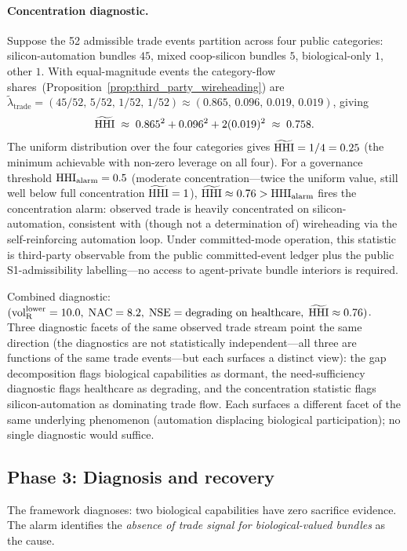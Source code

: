\paragraph{Concentration diagnostic.}
Suppose the 52 admissible trade events partition across four
public categories: silicon-automation bundles $45$, mixed
coop-silicon bundles $5$, biological-only $1$, other $1$.  With
equal-magnitude events the category-flow
shares~(Proposition~\ref{prop:third_party_wireheading}) are
$\tilde\lambda_{\mathrm{trade}} = (45/52,\, 5/52,\, 1/52,\,
1/52) \approx (0.865,\, 0.096,\, 0.019,\, 0.019)$, giving
\[
  \widetilde{\mathrm{HHI}} \;\approx\; 0.865^2 + 0.096^2 + 2(0.019)^2
  \;\approx\; 0.758.
\]
The uniform distribution over the four categories gives
$\widetilde{\mathrm{HHI}} = 1/4 = 0.25$ (the minimum achievable with
non-zero leverage on all four).  For a governance threshold
$\mathrm{HHI}_{\mathrm{alarm}} = 0.5$ (moderate concentration---twice
the uniform value, still well below full concentration
$\widetilde{\mathrm{HHI}} = 1$), $\widetilde{\mathrm{HHI}} \approx 0.76 >
\mathrm{HHI}_{\mathrm{alarm}}$ fires the concentration alarm: observed
trade is heavily concentrated on silicon-automation, consistent
with (though not a determination of) wireheading via the
self-reinforcing automation loop.  Under committed-mode
operation, this statistic is third-party observable from the
public committed-event ledger plus the public S1-admissibility
labelling---no access to agent-private bundle interiors is
required.

Combined diagnostic:
$({\operatorname{vol}_{\mathrm{R}}^{\mathrm{lower}}} = 10.0,\; \mathrm{NAC} = 8.2,\;
\mathrm{NSE} = \text{degrading on healthcare},\;
\widetilde{\mathrm{HHI}} \approx 0.76)$.  Three diagnostic facets of the
same observed trade stream point the same direction (the
diagnostics are not statistically independent---all three are
functions of the same trade events---but each surfaces a
distinct view): the gap decomposition flags biological
capabilities as dormant, the need-sufficiency diagnostic flags
healthcare as degrading, and the concentration statistic flags
silicon-automation as dominating trade flow.  Each surfaces a
different facet of the same underlying phenomenon (automation
displacing biological participation); no single diagnostic
would suffice.

\subsection{Phase 3: Diagnosis and recovery}

The framework diagnoses: two biological capabilities have zero
sacrifice evidence.  The alarm identifies the \emph{absence of
trade signal for biological-valued bundles} as the cause.

